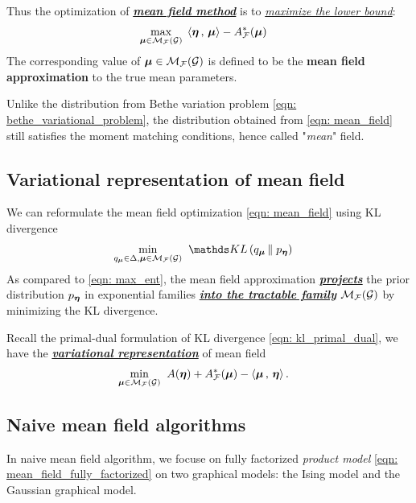 \documentclass[11pt]{article}
\begin{document}
Thus the optimization of \underline{\textbf{\emph{mean field method}}} is to \underline{\emph{maximize the lower bound}}:
\begin{align} 
\max_{\boldsymbol{\mu} \in {\mathcal M}_{{\mathcal F}}({\mathcal G})}&\;  \left\langle \boldsymbol{\eta}\,,\, \boldsymbol{\mu} \right\rangle - A_{{\mathcal F}}^{*}(\boldsymbol{\mu}) \label{eqn: mean_field}
\end{align} The corresponding value of $\boldsymbol{\mu} \in {\mathcal M}_{{\mathcal F}}({\mathcal G})$ is defined to be the \textbf{mean field approximation} to the true mean parameters.

Unlike the distribution from Bethe variation problem \eqref{eqn: bethe_variational_problem}, the distribution obtained from \eqref{eqn: mean_field} still satisfies the moment matching conditions, hence called  "\emph{mean}" field.

\subsection{Variational representation of mean field}
We can reformulate the mean field optimization \eqref{eqn: mean_field} using KL divergence 
\begin{align}
\min_{q_{\mb{\mu}} \in \Delta, \mb{\mu} \in \cM_{\cF}(\cG)}&\;\; \kl{q_{\mb{\mu}}}{p_{\mb{\eta}}} \label{eqn: max_ent_mean_field}
\end{align} As compared to \eqref{eqn: max_ent}, the mean field approximation \underline{\textbf{\emph{projects}}} the prior distribution $p_{\boldsymbol{\eta}}$ in exponential families \underline{\emph{\textbf{into the tractable family}}} ${\mathcal M}_{{\mathcal F}}({\mathcal G})$ by minimizing the KL divergence.

Recall the primal-dual formulation of KL divergence \eqref{eqn: kl_primal_dual}, we have the \underline{\textbf{\emph{variational representation}}} of mean field
\begin{align}
\min_{\boldsymbol{\mu} \in {\mathcal M}_{{\mathcal F}}({\mathcal G})}&\;\;  A(\boldsymbol{\eta}) + A_{{\mathcal F}}^{*}(\boldsymbol{\mu}) - \left\langle \boldsymbol{\mu}\,,\, \boldsymbol{\eta} \right\rangle. \label{eqn: max_ent_mean_field_primal_dual}
\end{align} 

\subsection{Naive mean field algorithms}
In naive mean field algorithm, we focuse on fully factorized \emph{product model} \eqref{eqn: mean_field_fully_factorized} on two graphical models: the Ising model and the Gaussian graphical model.
\end{document}

